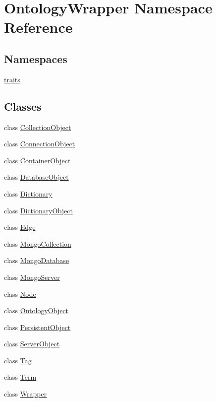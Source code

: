 \hypertarget{namespace_ontology_wrapper}{\section{Ontology\-Wrapper Namespace Reference}
\label{namespace_ontology_wrapper}
}
\subsection*{Namespaces}
\begin{DoxyCompactItemize}
\item 
\hyperlink{namespace_ontology_wrapper_1_1traits}{traits}
\end{DoxyCompactItemize}
\subsection*{Classes}
\begin{DoxyCompactItemize}
\item 
class \hyperlink{class_ontology_wrapper_1_1_collection_object}{Collection\-Object}
\item 
class \hyperlink{class_ontology_wrapper_1_1_connection_object}{Connection\-Object}
\item 
class \hyperlink{class_ontology_wrapper_1_1_container_object}{Container\-Object}
\item 
class \hyperlink{class_ontology_wrapper_1_1_database_object}{Database\-Object}
\item 
class \hyperlink{class_ontology_wrapper_1_1_dictionary}{Dictionary}
\item 
class \hyperlink{class_ontology_wrapper_1_1_dictionary_object}{Dictionary\-Object}
\item 
class \hyperlink{class_ontology_wrapper_1_1_edge}{Edge}
\item 
class \hyperlink{class_ontology_wrapper_1_1_mongo_collection}{Mongo\-Collection}
\item 
class \hyperlink{class_ontology_wrapper_1_1_mongo_database}{Mongo\-Database}
\item 
class \hyperlink{class_ontology_wrapper_1_1_mongo_server}{Mongo\-Server}
\item 
class \hyperlink{class_ontology_wrapper_1_1_node}{Node}
\item 
class \hyperlink{class_ontology_wrapper_1_1_ontology_object}{Ontology\-Object}
\item 
class \hyperlink{class_ontology_wrapper_1_1_persistent_object}{Persistent\-Object}
\item 
class \hyperlink{class_ontology_wrapper_1_1_server_object}{Server\-Object}
\item 
class \hyperlink{class_ontology_wrapper_1_1_tag}{Tag}
\item 
class \hyperlink{class_ontology_wrapper_1_1_term}{Term}
\item 
class \hyperlink{class_ontology_wrapper_1_1_wrapper}{Wrapper}
\end{DoxyCompactItemize}


